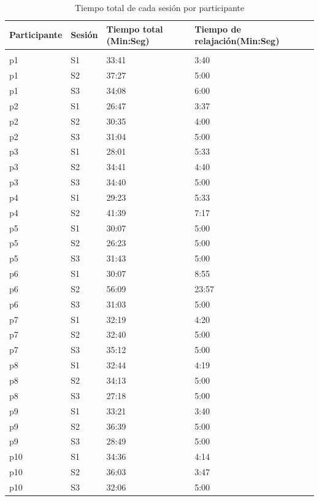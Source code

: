         \begin{table}[h!]
                \footnotesize
                \centering
                \caption{Tiempo total de cada sesi\'on por participante}
               \label{table:timingsbysubject}


                \begin{tabular}{m{2.5cm}m{2.5cm}m{3.5cm}m{3.5cm}}
                        \hline\noalign{\smallskip}

                \textbf{Participante} & \textbf{Sesi\'on} & \textbf{Tiempo total (Min:Seg)} & \textbf{Tiempo de relajaci\'on(Min:Seg)}\\
                \hline
                        \\ \noalign{\smallskip}
					p1 &S1& 33:41&3:40\\
					p1 &S2& 37:27&5:00\\
					p1 &S3& 34:08&6:00\\
					p2 &S1& 26:47&3:37\\
					p2 &S2& 30:35&4:00\\
					p2 &S3& 31:04&5:00\\
					p3 &S1& 28:01&5:33\\
					p3 &S2& 34:41&4:40\\
					p3 &S3& 34:40&5:00\\
					p4 &S1& 29:23&5:33\\
					p4 &S2& 41:39&7:17\\
					p5 &S1& 30:07&5:00\\
					p5 &S2& 26:23&5:00\\
					p5 &S3& 31:43&5:00\\
					p6 &S1& 30:07&8:55\\
					p6 &S2& 56:09&23:57\\
					p6 &S3& 31:03&5:00\\
					p7 &S1& 32:19&4:20\\
					p7 &S2& 32:40&5:00\\
					p7 &S3& 35:12&5:00\\
					p8 &S1& 32:44&4:19\\
					p8 &S2& 34:13&5:00\\
					p8 &S3& 27:18&5:00\\
					p9 &S1& 33:21&3:40\\
					p9 &S2& 36:39&5:00\\
					p9 &S3& 28:49&5:00\\
					p10 &S1& 34:36&4:14\\
					p10 &S2& 36:03&3:47\\
					p10 &S3& 32:06&5:00\\
        \end{tabular}
\end{table}


